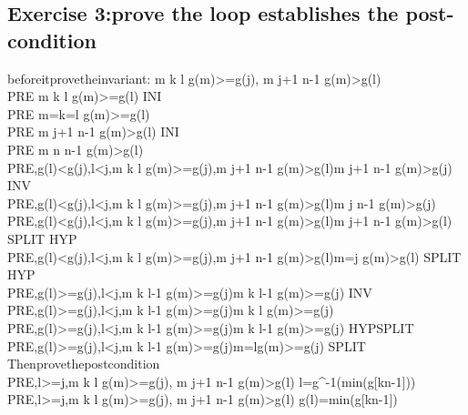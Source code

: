 \documentclass[11pt,a4paper,fleqn]{article}
\begin{document}
\subsection{Exercise 3:prove the loop establishes the post-condition}
\noindent
before\;it\;prove\;the\;invariant:\; \forall m \in k \upto l \Rightarrow g(m)>=g(j), \forall m \in j+1 \upto n-1 \Rightarrow g(m)>g(l) \\
PRE \vdash [l:=k]\forall m \in k \upto l \Rightarrow g(m)>=g(l) \;INI \\
PRE \vdash m=k=l \Rightarrow g(m)>=g(l) \\
PRE \vdash [j:=n-1]\forall m \in j+1 \upto n-1 \Rightarrow g(m)>g(l) \;INI \\
PRE \vdash \forall m \in n \upto n-1 \Rightarrow g(m)>g(l) \\
PRE,g(l)<g(j),l<j,\forall m \in k \upto l \Rightarrow g(m)>=g(j),\forall m \in j+1 \upto n-1 \Rightarrow g(m)>g(l)\vdash [j:=j-1]\forall m \in j+1 \upto n-1 \Rightarrow g(m)>g(j) \;INV \\
PRE,g(l)<g(j),l<j,\forall m \in k \upto l \Rightarrow g(m)>=g(j),\forall m \in j+1 \upto n-1 \Rightarrow g(m)>g(l)\vdash \forall m \in j \upto n-1 \Rightarrow g(m)>g(j) \\
PRE,g(l)<g(j),l<j,\forall m \in k \upto l \Rightarrow g(m)>=g(j),\forall m \in j+1 \upto n-1 \Rightarrow g(m)>g(l)\vdash \forall m \in j+1 \upto n-1 \Rightarrow g(m)>g(l) \; SPLIT \; HYP\\
PRE,g(l)<g(j),l<j,\forall m \in k \upto l \Rightarrow g(m)>=g(j),\forall m \in j+1 \upto n-1 \Rightarrow g(m)>g(l)\vdash  m=j \Rightarrow g(m)>g(l) \; SPLIT \; HYP\\
PRE,g(l)>=g(j),l<j,\forall m \in k \upto l-1 \Rightarrow g(m)>=g(j)\vdash [l:=l+1]\forall m \in k \upto l-1 \Rightarrow g(m)>=g(j) \;INV \\
PRE,g(l)>=g(j),l<j,\forall m \in k \upto l-1 \Rightarrow g(m)>=g(j)\vdash \forall m \in k \upto l \Rightarrow g(m)>=g(j) \\
PRE,g(l)>=g(j),l<j,\forall m \in k \upto l-1 \Rightarrow g(m)>=g(j)\vdash \forall m \in k \upto l-1 \Rightarrow g(m)>=g(j) \;HYP\;SPLIT\\
PRE,g(l)>=g(j),l<j,\forall m \in k \upto l-1 \Rightarrow g(m)>=g(j)\vdash m=l\Rightarrow g(m)>=g(j) \;SPLIT\\
\noindent
Then\;prove\;the\;post\;condition \\
PRE,l>=j,\forall m \in k \upto l \Rightarrow g(m)>=g(j), \forall m \in j+1 \upto n-1 \Rightarrow g(m)>g(l) \vdash l=g^{-1}(min(g[k\upto n-1])) \\
PRE,l>=j,\forall m \in k \upto l \Rightarrow g(m)>=g(j), \forall m \in j+1 \upto n-1 \Rightarrow g(m)>g(l) \vdash g(l)=min(g[k\upto n-1]) \\












%
%
\end{document}
